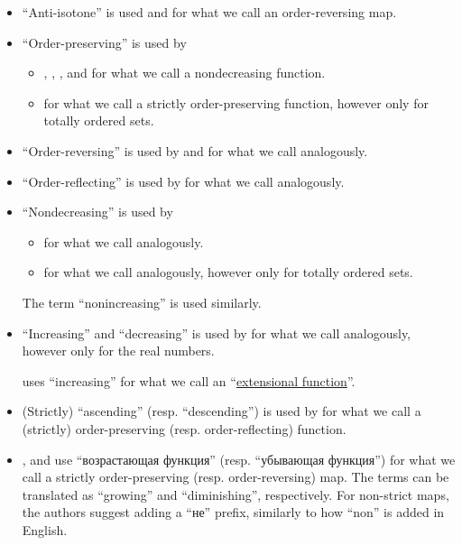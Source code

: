 \begin{remark}
\begin{itemize}
    \item \enquote{Anti-isotone} is used  and  for what we call an order-reversing map.

    \item \enquote{Order-preserving} is used by
    \begin{itemize}
       \item {}, , ,  and  for what we call a nondecreasing function.

       \item {} for what we call a strictly order-preserving function, however only for totally ordered sets.
    \end{itemize}

    \item \enquote{Order-reversing} is used by  and  for what we call analogously.

    \item \enquote{Order-reflecting} is used by  for what we call analogously.

    \item \enquote{Nondecreasing} is used by
    \begin{itemize}
      \item {} for what we call analogously.
      \item {} for what we call analogously, however only for totally ordered sets.
    \end{itemize}

    The term \enquote{nonincreasing} is used similarly.

    \item \enquote{Increasing} and \enquote{decreasing} is used by  for what we call analogously, however only for the real numbers.

     uses \enquote{increasing} for what we call an \enquote{\hyperref[def:extensive_function]{extensional function}}.

    \item (Strictly) \enquote{ascending} (resp. \enquote{descending}) is used by  for what we call a (strictly) order-preserving (resp. order-reflecting) function.

    \item {},  and  use \enquote{возрастающая функция} (resp. \enquote{убывающая функция}) for what we call a strictly order-preserving (resp. order-reversing) map. The terms can be translated as \enquote{growing} and \enquote{diminishing}, respectively. For non-strict maps, the authors suggest adding a \enquote{не} prefix, similarly to how \enquote{non} is added in English.
  \end{itemize}
\end{remark}

